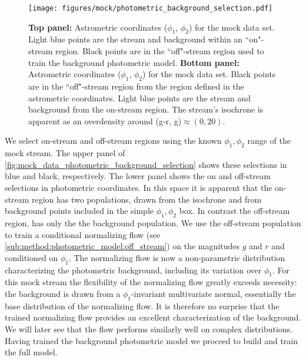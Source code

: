 \documentclass[twocolumn]{aastex631}
\begin{document}
        \begin{figure}
            \centering
            \texttt{[image: figures/mock/photometric\_background\_selection.pdf]}
            \caption{
                \textbf{Top panel:} Astrometric coordinates ($\phi_1$, $\phi_2$) for
                the mock data set.  Light blue points are the stream and background
                within an ``on"-stream region. Black points are in the ``off"-stream
                region used to train the background photometric model.
                \textbf{Bottom panel:} Astrometric coordinates ($\phi_1$, $\phi_2$)
                for the mock data set.  Black points are in the ``off"-stream region
                from the region defined in the astrometric coordinates.  Light blue
                points are the stream and background from the on-stream region. The
                stream's isochrone is apparent as an overdensity around (g-r,
                g)$\approx (0, 20)$.  }
            \label{fig:mock_data_photometric_background_selection}
        \end{figure}
    
        We select on-stream and off-stream regions using the known $\phi_1, \phi_2$
        range of the mock stream.  The upper panel of
        \autoref{fig:mock_data_photometric_background_selection} shows these
        selections in blue and black, respectively.  The lower panel shows the on and
        off-stream selections in photometric coordinates.  In this space it is
        apparent that the on-stream region has two populations, drawn from the
        isochrone and from background points included in the simple $\phi_1, \phi_2$
        box.  In contrast the off-stream region, has only the the background population.
        We use the off-stream population to train a conditional normalizing flow
        (see \autoref{sub:method:photometric_model:off_stream}) on the magnitudes
        $g$ and $r$ and conditioned on $\phi_1$.  The normalizing flow is now a
        non-parametric distribution characterizing the photometric background,
        including its variation over $\phi_1$.  For this mock stream the flexibility
        of the normalizing flow greatly exceeds necessity: the background is
        drawn from a $\phi_1$-invariant multivariate normal, essentially the base
        distribution of the normalizing flow.  It is therefore no surprise that
        the trained normalizing flow provides an excellent characterization of
        the background.  We will later see that the flow performs similarly well
        on complex distributions.  Having trained the background photometric model
        we proceed to build and train the full model.
    
\end{document}
